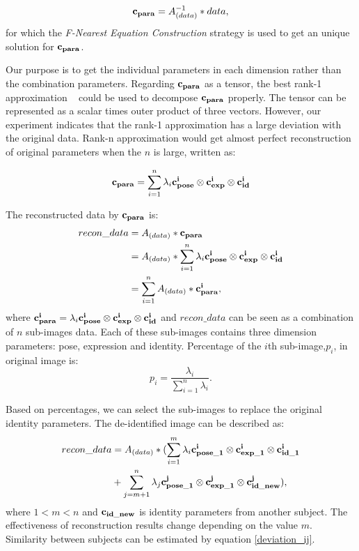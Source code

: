 		\begin{equation}
			{\bf c_{para}} = A_{(data)}^{-1} * data,
		\end{equation}
		for which the {\it F-Nearest Equation Construction} strategy \cite{lin05} is used to get an unique solution for ${\bf c_{para}}$. 
		
		Our purpose is to get the individual parameters in each dimension rather than the combination parameters. Regarding ${\bf c_{para}}$ as a tensor, the best rank-1 approximation ~\cite{Lathauwer_rank} could be used to decompose ${\bf c_{para}}$ properly. The tensor can be represented as a scalar times outer product of three vectors. However, our experiment indicates that the rank-1 approximation has a large deviation with the original data. Rank-n approximation would get almost perfect reconstruction of original parameters when the $n$ is large, written as:

		\begin{equation}
			{\bf c_{para}} = \sum_{i=1}^{n}\lambda_i {\bf c_{pose}^i} \otimes {\bf c_{exp}^i} \otimes {\bf c_{id}^i}
		\end{equation}
		
		The reconstructed data by ${\bf c_{para}}$ is:
		\begin{equation}
			\begin{aligned}
				recon\_data & =A_{(data)} * {\bf c_{para}} \\
				& = A_{(data)} * \sum_{i=1}^{n}\lambda_i {\bf c_{pose}^i} \otimes {\bf c_{exp}^i} \otimes {\bf c_{id}^i} \\
				& = \sum_{i=1}^{n}A_{(data)} * {\bf c_{para}^i}, \\
			\end{aligned}
		\end{equation}
		where ${\bf c_{para}^i} = \lambda_i {\bf c_{pose}^i} \otimes {\bf c_{exp}^i} \otimes {\bf c_{id}^i}$ and $recon\_data$ can be seen as a combination of $n$ sub-images data. Each of these sub-images contains three dimension parameters: pose, expression and identity. Percentage of the $i$th sub-image,$p_i$, in original image is:
		\begin{equation}
			p_i = \frac{\lambda_i}{\sum_{i=1}^{n}\lambda_i}.
		\end{equation}

		Based on percentages, we can select the sub-images to replace the original identity parameters.	The de-identified image can be described as:
		\begin{equation}
			\begin{aligned}
				recon\_data & = A_{(data)} * (\sum_{i=1}^{m}\lambda_i {\bf c_{pose\_1}^i} \otimes {\bf c_{exp\_1}^i} \otimes {\bf c_{id\_1}^i} \\ & + \sum_{j=m+1}^{n}\lambda_j {\bf c_{pose\_1}^j} \otimes {\bf c_{exp\_1}^j} \otimes {\bf c_{id\_new}^j}),
			\end{aligned}
			\label{compo}
		\end{equation}
		where $1<m<n$ and ${\bf c_{id\_new}}$ is identity parameters from another subject. The effectiveness of reconstruction results change depending on the value $m$. Similarity between subjects can be estimated by equation \ref{deviation_ij}. 
